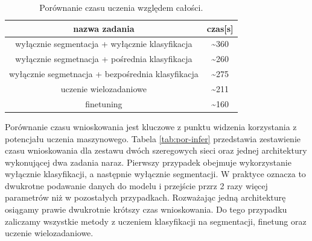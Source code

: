 

\begin{table}[ht!]
    \centering
    \begin{tabular}{c|c}
        nazwa zadania                      &   czas{[}s{]} \\ \hline
        wyłącznie segmentacja +  wyłącznie klasyfikacja & \textasciitilde 360 \\
        wyłącznie segmetnacja + pośrednia klasyfikacja & \textasciitilde 260 \\
        wyłącznie segmetnacja + bezpośrednia klasyfikacja & \textasciitilde 275 \\
        uczenie wielozadaniowe                   &   \textasciitilde 211 \\
        finetuning                        &   \textasciitilde 160 
\end{tabular}
\caption{Porównanie czasu uczenia względem całości.}
\label{tab:por-trening-all}
\end{table}


Porównanie czasu wnioskowania jest kluczowe z punktu widzenia korzystania z potencjału uczenia maszynowego. Tabela \ref{tab:por-infer} przedstawia zestawienie czasu wnioskowania dla zestawu dwóch szeregowych sieci oraz jednej architektury wykonującej dwa zadania naraz. Pierwszy przypadek obejmuje wykorzystanie wyłącznie klasyfikacji, a następnie wyłącznie segmentacji. W praktyce oznacza to dwukrotne podawanie danych do modelu i przejście przrz 2 razy więcej parametrów niż w pozostałych przypadkach. Rozważając jedną architekturę osiągamy prawie dwukrotnie krótszy czas wnioskowania. Do tego przypadku zaliczamy wszystkie metody z uczeniem klasyfikacji na segmentacji, finetung oraz uczenie wielozadaniowe.


